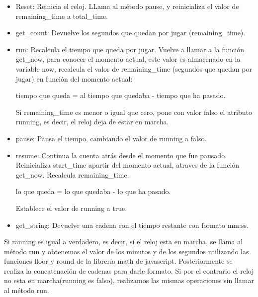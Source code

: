 \begin{itemize}
 \item Reset: Reinicia el reloj. LLama al método pause, y reinicializa el valor de remaining\_time a total\_time.

 \item get\_count: Devuelve los segundos que quedan por jugar (remaining\_time).

 \item run: Recalcula el tiempo que queda por jugar. Vuelve a llamar a la función get\_now, para conocer el momento actual, este valor es almacenado 
en la variable now, recalcula el valor de remaining\_time (segundos que quedan por jugar) en función del momento actual:

        tiempo que queda = al tiempo que quedaba - tiempo que ha pasado.
        
Si remaining\_time es menor o igual que cero, pone con valor falso el atributo running, es decir, el reloj deja de estar en marcha.

 \item pause: Pausa el tiempo, cambiando el valor de running a falso.

 \item resume: Continua la cuenta atrás desde el momento que fue pausado. Reinicializa start\_time apartir del momento actual, atraves de la 
 función get\_now. Recalcula remaining\_time.

        lo que queda = lo que quedaba - lo que ha pasado.

Establece el valor de running a true.

 \item get\_string: Devuelve una cadena con el tiempo restante con formato mm:ss.
\end{itemize}

Si ranning es igual a verdadero, es decir, si el reloj esta en marcha, se llama al método run y obtenemos el valor de los minutos y de los 
segundos utilizando las funciones floor y round de la librería math de javascript. Posteriormente se realiza la concatenación de cadenas para 
darle formato. Si por el contrario el reloj no esta en marcha(running es falso), realizamos las mismas operaciones sin llamar al método run.

